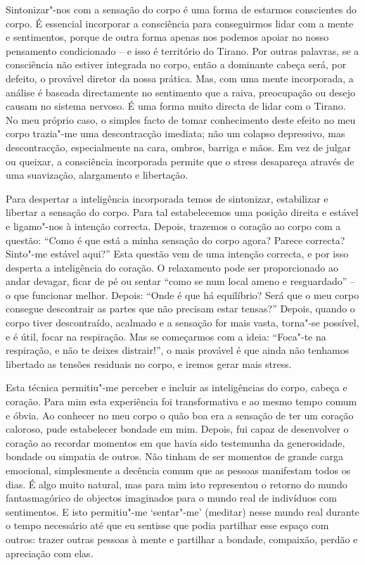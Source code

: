 Sintonizar"-nos com a sensação do corpo é uma forma de estarmos
conscientes do corpo. É essencial incorporar a consciência para
conseguirmos lidar com a mente e sentimentos, porque de outra forma
apenas nos podemos apoiar no nosso pensamento condicionado -- e isso é
território do Tirano. Por outras palavras, se a consciência não estiver
integrada no corpo, então a dominante cabeça será, por defeito, o
provável diretor da nossa prática. Mas, com uma mente incorporada, a
análise é baseada directamente no sentimento que a raiva, preocupação ou
desejo causam no sistema nervoso. É uma forma muito directa de lidar com
o Tirano. No meu próprio caso, o simples facto de tomar conhecimento
deste efeito no meu corpo trazia"-me uma descontracção imediata; não um
colapso depressivo, mas descontracção, especialmente na cara, ombros,
barriga e mãos. Em vez de julgar ou queixar, a consciência incorporada
permite que o stress desapareça através de uma suavização, alargamento e
libertação.

\sectionBreak

Para despertar a inteligência incorporada temos de sintonizar,
estabilizar e libertar a sensação do corpo. Para tal estabelecemos uma
posição direita e estável e ligamo"-nos à intenção correcta. Depois,
trazemos o coração ao corpo com a questão: “Como é que está a minha
sensação do corpo agora? Parece correcta? Sinto"-me estável aqui?” Esta
questão vem de uma intenção correcta, e por isso desperta a inteligência
do coração. O relaxamento pode ser proporcionado ao andar devagar, ficar
de pé ou sentar “como se num local ameno e resguardado” -- o que
funcionar melhor. Depois: “Onde é que há equilíbrio? Será que o meu
corpo consegue descontrair as partes que não precisam estar tensas?”
Depois, quando o corpo tiver descontraído, acalmado e a sensação for
mais vasta, torna"-se possível, e é útil, focar na respiração. Mas se
começarmos com a ideia: “Foca"-te na respiração, e não te deixes
distrair!”, o mais provável é que ainda não tenhamos libertado as
tensões residuais no corpo, e iremos gerar mais stress.

Esta técnica permitiu"-me perceber e incluir as inteligências do corpo,
cabeça e coração. Para mim esta experiência foi transformativa e ao
mesmo tempo comum e óbvia. Ao conhecer no meu corpo o quão boa era a
sensação de ter um coração caloroso, pude estabelecer bondade em mim.
Depois, fui capaz de desenvolver o coração ao recordar momentos em que
havia sido testemunha da generosidade, bondade ou simpatia de outros.
Não tinham de ser momentos de grande carga emocional, simplesmente a
decência comum que as pessoas manifestam todos os dias. É algo muito
natural, mas para mim isto representou o retorno do mundo fantasmagórico
de objectos imaginados para o mundo real de indivíduos com sentimentos. E
isto permitiu"-me `sentar"-me' (meditar) nesse mundo real durante o tempo
necessário até que eu sentisse que podia partilhar esse espaço com
outros: trazer outras pessoas à mente e partilhar a bondade, compaixão,
perdão e apreciação com elas.

